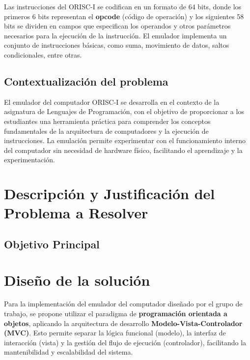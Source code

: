 \documentclass{article}
\begin{document}
Las instrucciones del ORISC-I se codifican en un formato de 64 bits, donde los primeros 6 bits representan el \textbf{opcode} (código de operación) y los siguientes 58 bits se dividen en campos que especifican los operandos y otros parámetros necesarios para la ejecución de la instrucción. El emulador implementa un conjunto de instrucciones básicas, como suma, movimiento de datos, saltos condicionales, entre otras.

\subsection{Contextualización del problema}

El emulador del computador ORISC-I se desarrolla en el contexto de la asignatura de Lenguajes de Programación, con el objetivo de proporcionar a los estudiantes una herramienta práctica para comprender los conceptos fundamentales de la arquitectura de computadores y la ejecución de instrucciones. La emulación permite experimentar con el funcionamiento interno del computador sin necesidad de hardware físico, facilitando el aprendizaje y la experimentación.


\section{Descripción y Justificación del Problema a Resolver}\label{sec:descr}


\subsection{Objetivo Principal}




\section{Diseño de la solución}\label{sec:dis}

Para la implementación del emulador del computador diseñado por el grupo de trabajo, se propone
utilizar el paradigma de \textbf{programación orientada a objetos}, aplicando la arquitectura de
desarrollo \textbf{Modelo-Vista-Controlador (MVC)}. Esto permite separar la lógica funcional
(modelo), la interfaz de interacción (vista) y la gestión del flujo de ejecución (controlador),
facilitando la mantenibilidad y escalabilidad del sistema.
\end{document}
